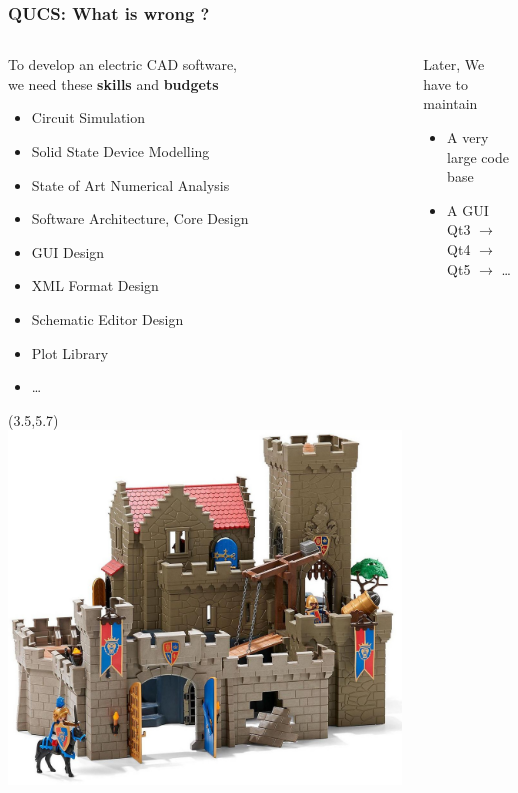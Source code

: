 \begin{frame}
  \frametitle{QUCS: What is wrong ?}
  \begin{columns}
    \begin{column}[t]{.5\textwidth}
      To develop an electric CAD software, \\
      we need these \textbf{skills} and \textbf{budgets}
      {\footnotesize
        \begin{itemize}
        \item Circuit Simulation
        \item Solid State Device Modelling
        \item State of Art Numerical Analysis
        \item Software Architecture, Core Design
        \item GUI Design
        \item XML Format Design
        \item Schematic Editor Design
        \item Plot Library
        \item \ldots
        \end{itemize}%
      }
      \begin{textblock}{6}(3.5,5.7) %
        \includegraphics[width=.55\textwidth]{images/playmobil-t.png}
      \end{textblock}
    \end{column}
    \begin{column}[t]{.5\textwidth}
      Later, We have to \alert{maintain} \\[.5em]
      \begin{itemize}
        \item A very large code base
        \item A GUI Qt3 $\rightarrow$ Qt4 $\rightarrow$ Qt5 $\rightarrow$ \ldots \\[1em]
      \end{itemize}

\end{column}
\end{columns}
\end{frame}
